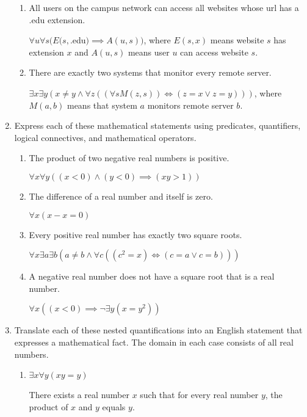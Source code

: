 \documentclass[11pt]{article}
\begin{document}
\begin{enumerate}[label=\textbf{\arabic*.}]
\begin{enumerate}[label=\textbf{\alph*)}]
		\item All users on the campus network can access all websites whose url has a .edu extension.
		
		$\forall u\forall s(E(s,$.edu$) \implies A(u, s))$, where $E(s, x)$ means website $s$ has extension $x$ and $A(u, s)$ means user $u$ can access website $s$.
		
		\item There are exactly two systems that monitor every remote server.
		
		$\exists x\exists y(x \ne y \land \forall z((\forall sM(z, s)) \iff (z = x \lor z = y)))$, where $M(a, b)$ means that system $a$ monitors remote server $b$.
	\end{enumerate}

	\item Express each of these mathematical statements using predicates, quantifiers, logical connectives, and mathematical operators.
	\begin{enumerate}[label=\textbf{\alph*)}]
		\item The product of two negative real numbers is positive.
		
		$\forall x\forall y((x < 0) \land (y < 0) \implies (xy > 1))$
		
		\item The difference of a real number and itself is zero.
		
		$\forall x(x - x = 0)$
		
		\item Every positive real number has exactly two square roots.
		
		$\forall x\exists a\exists b(a \ne b \land \forall c((c^2 = x) \iff (c = a \lor c = b)))$
		
		\item A negative real number does not have a square root that is a real number.
		
		$\forall x((x < 0) \implies \neg\exists y(x = y^2))$
	\end{enumerate}

	\item Translate each of these nested quantifications into an English statement that expresses a mathematical fact. The domain in each case consists of all real numbers.
	\begin{enumerate}[label=\textbf{\alph*)}]
		\item $\exists x\forall y(xy = y)$
		
		There exists a real number $x$ such that for every real number $y$, the product of $x$ and $y$ equals $y$.
		

\end{enumerate}
\end{enumerate}
\end{document}
